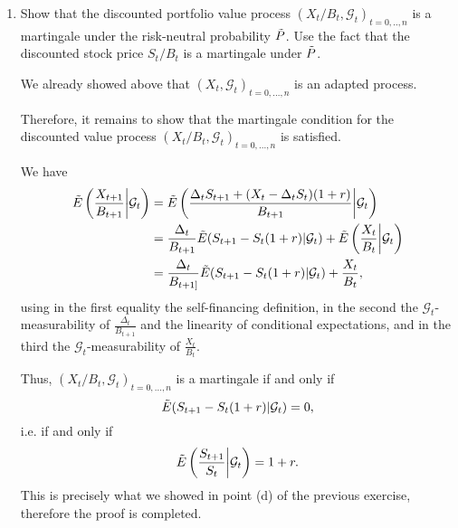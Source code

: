 \documentclass[handout,8pt]{beamer}
\begin{document}
\begin{frame}[allowframebreaks]{ }
\begin{enumerate}
\begin{enumerate}
        \item Show that the discounted portfolio value process $(X_t/B_t,\mathcal{G}_t)_{t=0,..,n}$ is a martingale under the risk-neutral probability $\Tilde{P}$. Use the fact that the discounted stock price $S_t/B_t$ is a martingale under $\Tilde{P}$.\newline
        
        We already showed above that $(X_t,\mathcal{G}_t)_{t=0,...,n}$ is an adapted process. \newline
        
        Therefore, it remains to show that the martingale condition for the discounted value process $(X_t/B_t,\mathcal{G}_t)_{t=0,...,n}$ is satisfied. \newline
        
        We have
        \begin{align*}
            \Tilde{E}\left(\frac{X_{t+1}}{B_{t+1}}\bigg\vert\mathcal{G}_t\right) &= \Tilde{E}\left(\frac{\Delta_tS_{t+1}+(X_t-\Delta_tS_t)(1+r)}{B_{t+1}}\bigg\vert \mathcal{G}_t\right)\\
            &= \frac{\Delta_t}{B_{t+1}}\Tilde{E}(S_{t+1}-S_t(1+r)| \mathcal{G}_t)+\Tilde{E}\left(\frac{X_t}{B_t}\bigg\vert \mathcal{G}_t\right)\\
            &= \frac{\Delta_t}{B_{t+1]}}\Tilde{E}(S_{t+1}-S_t(1+r)|\mathcal{G}_t) + \frac{X_t}{B_t},
        \end{align*}
        using in the first equality the self-financing definition, in the second the $\mathcal{G}_t$-measurability of $\frac{\Delta_t}{B_{t+1}}$ and the linearity of conditional expectations, and in the third the $\mathcal{G}_t$-measurability of $\frac{X_t}{B_t}$. \newline
        
        Thus, $(X_t/B_t,\mathcal{G}_t)_{t=0,...,n}$ is a martingale if and only if
        \begin{equation*}
            \Tilde{E}(S_{t+1} - S_t(1+r) | \mathcal{G}_t)=0,
        \end{equation*}
        i.e. if and only if
        \begin{equation*}
            \Tilde{E}\left(\frac{S_{t+1}}{S_t}\bigg\vert \mathcal{G}_t\right) = 1+r.
        \end{equation*}
        This is precisely what we showed in point (d) of the previous exercise, therefore the proof is completed.
    \end{enumerate}
    
\end{enumerate}





\end{frame}
\end{document}
